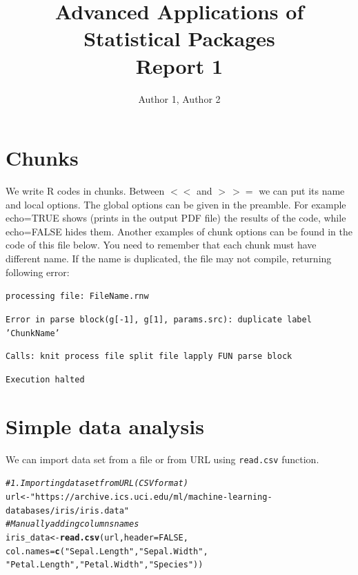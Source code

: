 \documentclass[12pt, a4paper]{article}\usepackage[]{graphicx}\usepackage[]{xcolor}
\makeatletter
\newcommand{\hlnum}[1]{\textcolor[rgb]{0.686,0.059,0.569}{#1}}%
\newcommand{\hlsng}[1]{\textcolor[rgb]{0.192,0.494,0.8}{#1}}%
\newcommand{\hlcom}[1]{\textcolor[rgb]{0.678,0.584,0.686}{\textit{#1}}}%
\newcommand{\hldef}[1]{\textcolor[rgb]{0.345,0.345,0.345}{#1}}%
\newcommand{\hlkwb}[1]{\textcolor[rgb]{0.69,0.353,0.396}{#1}}%
\newcommand{\hlkwc}[1]{\textcolor[rgb]{0.333,0.667,0.333}{#1}}%
\newcommand{\hlkwd}[1]{\textcolor[rgb]{0.737,0.353,0.396}{\textbf{#1}}}%
\newenvironment{kframe}{%
 \def\at@end@of@kframe{}%
 \ifinner\ifhmode%
  \def\at@end@of@kframe{\end{minipage}}%
  \begin{minipage}{\columnwidth}%
 \fi\fi%
 \def\FrameCommand##1{\hskip\@totalleftmargin \hskip-\fboxsep
 \colorbox{shadecolor}{##1}\hskip-\fboxsep
     \hskip-\linewidth \hskip-\@totalleftmargin \hskip\columnwidth}%
 \MakeFramed {\advance\hsize-\width
   \@totalleftmargin\z@ \linewidth\hsize
   \@setminipage}}%
 {\par\unskip\endMakeFramed%
 \at@end@of@kframe}
\newenvironment{knitrout}{}{} %
\makeatother
\begin{document}

\title{Advanced Applications of Statistical Packages\\
Report 1}
\author{Author 1, Author 2}
\maketitle

\tableofcontents 

\newpage

\section{Chunks}

We write R codes in chunks. Between $<<$ and $>\,>=$ we can put its name and local options. The global options can be given in the preamble. For example echo=TRUE shows (prints in the output PDF file) the results of the code, while echo=FALSE hides them. Another examples of chunk options can be found in the code of this file below.
You need to remember that each chunk must have different name. If the name is duplicated, the file may not compile, returning following error:

\texttt{processing file: FileName.rnw}

\texttt{Error in parse block(g[-1], g[1], params.src): duplicate label 'ChunkName'}

\texttt{Calls: knit process file split file lapply FUN parse block}

\texttt{Execution halted}


\section{Simple data analysis}
\label{s:dataanalysis}
We can import data set from a file or from URL using \texttt{read.csv} function.
\begin{knitrout}
\color{fgcolor}\begin{kframe}
\begin{alltt}
\hlcom{# 1. Importing data set from URL (CSV format)}
\hldef{url} \hlkwb{<-} \hlsng{"https://archive.ics.uci.edu/ml/machine-learning-databases/iris/iris.data"}
\hlcom{# Manually adding columns names}
\hldef{iris_data} \hlkwb{<-} \hlkwd{read.csv}\hldef{(url,} \hlkwc{header} \hldef{=} \hlnum{FALSE}\hldef{,}
                      \hlkwc{col.names} \hldef{=} \hlkwd{c}\hldef{(}\hlsng{"Sepal.Length"}\hldef{,} \hlsng{"Sepal.Width"}\hldef{,}
                                    \hlsng{"Petal.Length"}\hldef{,} \hlsng{"Petal.Width"}\hldef{,} \hlsng{"Species"}\hldef{))}
\end{alltt}
\end{kframe}
\end{knitrout}
\end{document}
